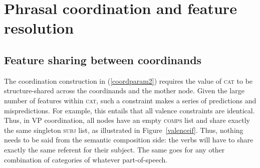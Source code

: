 {\section{Phrasal coordination and feature resolution}

\subsection{Feature sharing between coordinands}

The coordination construction in (\ref{coordparam2}) requires the value of \textsc{cat} to be structure-shared across the coordinands and the mother node. Given the large number of features within \textsc{cat}, such a constraint makes a series of predictions and mispredictions.
For example, this entails that all valence constraints are identical. Thus, in VP coordination, all nodes have an empty \textsc{comps} list and share exactly the same singleton \textsc{subj} list, as illustrated in Figure~\ref{valenceif}. Thus, nothing needs to be said from the semantic composition side: the verbs will have to share exactly the same referent for their subject. The same goes for any other combination of categories of whatever part-of-speech.




}
